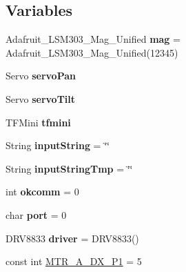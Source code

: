 \subsection*{Variables}
\begin{DoxyCompactItemize}
\item 
\mbox{\label{ari_pi__2_d_c__esp__08_8ino_a8358c2402fb15c1b0f5fbbfb0a1e6a85}} 
Adafruit\+\_\+\+L\+S\+M303\+\_\+\+Mag\+\_\+\+Unified {\bfseries mag} = Adafruit\+\_\+\+L\+S\+M303\+\_\+\+Mag\+\_\+\+Unified(12345)
\item 
\mbox{\label{ari_pi__2_d_c__esp__08_8ino_aaf3c8c8d2e46ac81d19dda9e4213d6a1}} 
Servo {\bfseries servo\+Pan}
\item 
\mbox{\label{ari_pi__2_d_c__esp__08_8ino_a1a47b66f30649678ffd87493fe397afd}} 
Servo {\bfseries servo\+Tilt}
\item 
\mbox{\label{ari_pi__2_d_c__esp__08_8ino_aa556a72ca05ce9a3861b99c901bc58d6}} 
T\+F\+Mini {\bfseries tfmini}
\item 
\mbox{\label{ari_pi__2_d_c__esp__08_8ino_abfa7bc4032f1ef9070aa48a183f30d4a}} 
String {\bfseries input\+String} = \char`\"{}\char`\"{}
\item 
\mbox{\label{ari_pi__2_d_c__esp__08_8ino_a54b4b16653970eab34e2ba40199fd6f3}} 
String {\bfseries input\+String\+Tmp} = \char`\"{}\char`\"{}
\item 
\mbox{\label{ari_pi__2_d_c__esp__08_8ino_a0f792197854bfeff54c46ebf012b2187}} 
int {\bfseries okcomm} = 0
\item 
\mbox{\label{ari_pi__2_d_c__esp__08_8ino_a4b20c17190582b367bfba9b9bd5ea962}} 
char {\bfseries port} = 0
\item 
\mbox{\label{ari_pi__2_d_c__esp__08_8ino_ac547551c409b3659bcfa04a597e8d76b}} 
D\+R\+V8833 {\bfseries driver} = D\+R\+V8833()
\item 
const int \mbox{\hyperlink{ari_pi__2_d_c__esp__08_8ino_ab8a00bd06cb46156aa7cb936b4eb8c85}{M\+T\+R\+\_\+\+A\+\_\+\+D\+X\+\_\+\+P1}} = 5

\end{DoxyCompactItemize}
